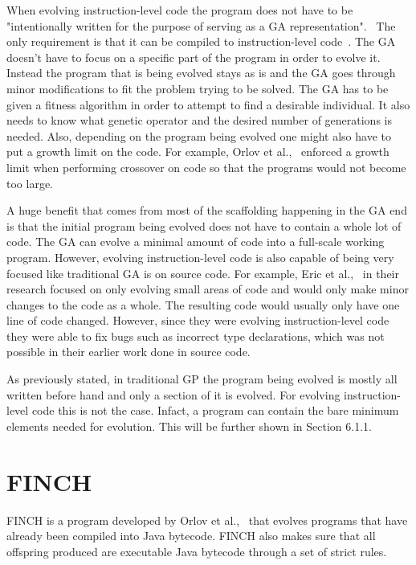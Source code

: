 \documentclass{sig-alternate}
\begin{document}
When evolving instruction-level code the program does not have to be "intentionally written for the purpose of serving as a GA representation".~\cite{FINCH2:2009} The only requirement is that it can be compiled to instruction-level code~\cite{FINCH2:2009, Assembly:2010}. The GA doesn't have to focus on a specific part of the program in order to evolve it. Instead the program that is being evolved stays as is and the GA goes through minor modifications to fit the problem trying to be solved. The GA has to be given a fitness algorithm in order to attempt to find a desirable individual. It also needs to know what genetic operator and the desired number of generations is needed. Also, depending on the program being evolved one might also have to put a growth limit on the code. For example, Orlov et al.,~\cite{FINCH:2011} enforced a growth limit when performing crossover on code so that the programs would not become too large. 

A huge benefit that comes from most of the scaffolding happening in the GA end is that the initial program being evolved does not have to contain a whole lot of code. The GA can evolve a minimal amount of code into a full-scale working program. However, evolving instruction-level code is also capable of being very focused like traditional GA is on source code. For example, Eric et al.,~\cite{Assembly:2010} in their research focused on only evolving small areas of code and would only make minor changes to the code as a whole. The resulting code would usually only have one line of code changed. However, since they were evolving instruction-level code they were able to fix bugs such as incorrect type declarations, which was not possible in their earlier work done in source code. 

As previously stated, in traditional GP the program being evolved is mostly all written before hand and only a section of it is evolved. For evolving instruction-level code this is not the case. Infact, a program can contain the bare minimum elements needed for evolution. This will be further shown in Section 6.1.1. 


\section{FINCH}
FINCH is a program developed by Orlov et al.,~\cite{FINCH2:2009,FINCH:2011} that evolves programs that have already been compiled into Java bytecode. FINCH also makes sure that all offspring produced are executable Java bytecode through a set of strict rules. 
\end{document}
